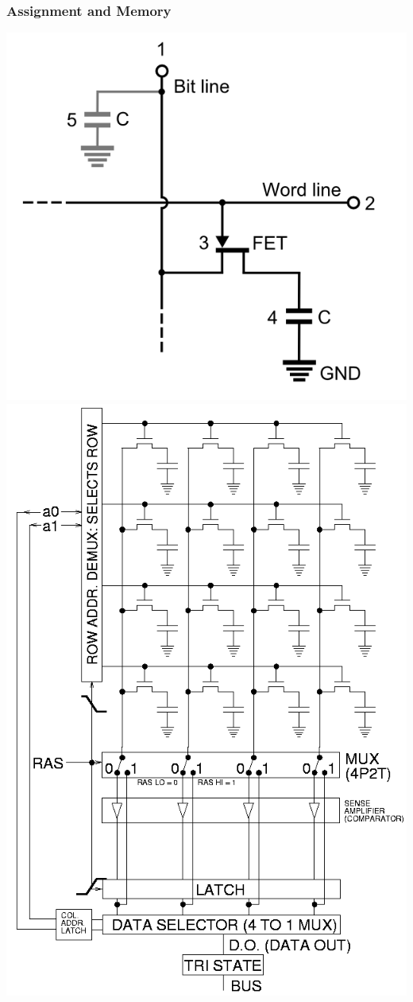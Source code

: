 \documentclass[fleqn]{beamer} %
\newcommand{\sectiontitleIII}{Assignment and Memory}
\begin{document}
	\begin{frame} \small
		\frametitle{\sectiontitleIII}
		
		\includegraphics[scale=.20]{DRAM_memcell.png}
		\includegraphics[scale=.10]{Square_array_memcells.png} 

\end{frame}
\end{document}

